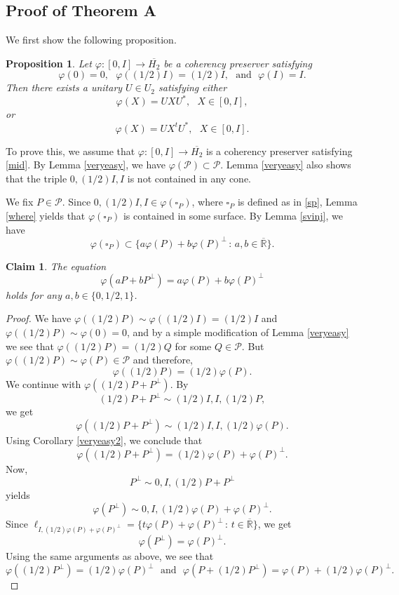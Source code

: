 \documentclass[10pt,a4paper]{amsart}
\newcommand\oH{{\overline{H_2}}}
\newcommand\oR{{\overline{\mathbb{R}}}}
\newtheorem{proposition}[theorem]{Proposition}
\newtheorem{claim}[theorem]{Claim}
\theoremstyle{definition}
\theoremstyle{remark}
\numberwithin{subsection}{section}
\numberwithin{equation}{section}
\begin{document}
\subsection{Proof of Theorem A}\label{ptand}
We first show the following proposition.
\begin{proposition}\label{unitary}
Let $\varphi\colon [0, I]\to \oH$ be a coherency preserver satisfying 
\begin{equation}\label{mid}
\varphi (0) = 0, \ \ \ \varphi ((1/2)I) = (1/2)I, \ \ \ \text{and} \ \ \ \varphi (I) = I.
\end{equation}
Then there exists a unitary $U\in U_2$ satisfying either 
\[
\varphi(X)=UXU^*,\ \ \ X\in [0, I],
\]
or 
\[
\varphi(X)=UX^tU^*, \ \ \ X\in [0, I].
\]
\end{proposition}
To prove this, we assume that $\varphi\colon [0, I]\to \oH$ is a coherency preserver satisfying \eqref{mid}.
By Lemma \ref{veryeasy}, we have $\varphi (\mathcal{P}) \subset \mathcal{P}$.
Lemma \ref{veryeasy} also shows that the triple $0, (1/2)I, I$ is not contained in any cone.

We fix $P \in \mathcal{P}$. Since $0, (1/2)I, I \in \varphi ({\square}_P)$, where ${\square}_P$ is defined as in \eqref{sp}, Lemma \ref{where} yields that $\varphi ({\square}_P)$ is contained in some surface. By Lemma \ref{svinj}, we have
\[
\varphi ({\square}_P) \subset 
\{ a \varphi (P) + b \varphi (P)^\perp \, : \, a,b \in {\oR} \}.
\]


\begin{claim}\label{0121}
The equation
\begin{equation}\label{iris}
\varphi (aP + bP^\perp ) = a \varphi (P) + b \varphi (P)^\perp
\end{equation}
holds for any $a, b\in \{0, 1/2, 1\}$.
\end{claim}
\begin{proof}
We have $\varphi ( (1/2)P) \sim \varphi ((1/2)I) =(1/2)I$ and $\varphi ((1/2)P) \sim \varphi (0) = 0$, and by a simple modification of Lemma \ref{veryeasy} we see that $\varphi ( (1/2)P) = (1/2)Q$ for some $Q \in \mathcal{P}$. But $\varphi ( (1/2)P) \sim \varphi (P)\in \mathcal{P}$ and therefore,
\[
\varphi ((1/2)P) = (1/2)\varphi (P).
\]
We continue with $\varphi ((1/2)P + P^\perp)$. By
\[
(1/2)P + P^\perp \sim (1/2)I, I, (1/2)P,
\] 
we get
\[
\varphi ((1/2)P + P^\perp) \sim (1/2)I, I, (1/2) \varphi (P).
\]
Using Corollary \ref{veryeasy2}, we conclude that
\[
\varphi ((1/2)P + P^\perp) = (1/2) \varphi (P)+ \varphi(P)^\perp.
\]
Now,
\[
P^\perp \sim 0, I, (1/2)P + P^\perp
\]
yields
\[
\varphi(P^\perp) \sim 0, I, (1/2) \varphi (P)+ \varphi(P)^\perp.
\]
Since $\ell_{I, (1/2) \varphi (P)+ \varphi(P)^\perp} = \{t\varphi(P)+\varphi(P)^\perp\,:\,  t\in \oR\}$, we get
\[
\varphi (P^\perp) = \varphi (P)^\perp.
\]
Using the same arguments as above, we see that
\[
\varphi ((1/2)P^\perp) = (1/2)\varphi (P)^\perp \ \ \ \text{and} \ \ \  \varphi (P + (1/2)P^\perp) = \varphi (P) + (1/2)\varphi (P)^\perp .
\]
\end{proof}
\end{document}
